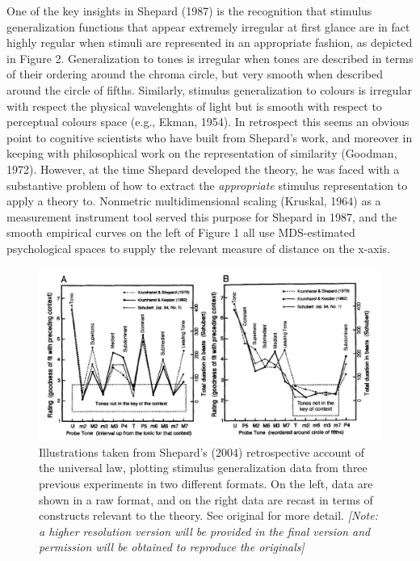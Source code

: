 \documentclass[english,doc]{apa6}
\begin{document}
One of the key insights in Shepard (1987) is the recognition that stimulus generalization functions that appear extremely irregular at first glance are in fact highly regular when stimuli are represented in an appropriate fashion, as depicted in Figure 2. Generalization to tones is irregular when tones are described in terms of their ordering around the chroma circle, but very smooth when described around the circle of fifths. Similarly, stimulus generalization to colours is irregular with respect the physical wavelenghts of light but is smooth with respect to perceptual colours space (e.g., Ekman, 1954). In retrospect this seems an obvious point to cognitive scientists who have built from Shepard's work, and moreover in keeping with philosophical work on the representation of similarity (Goodman, 1972). However, at the time Shepard developed the theory, he was faced with a substantive problem of how to extract the \emph{appropriate} stimulus representation to apply a theory to. Nonmetric multidimensional scaling (Kruskal, 1964) as a measurement instrument tool served this purpose for Shepard in 1987, and the smooth empirical curves on the left of Figure 1 all use MDS-estimated psychological spaces to supply the relevant measure of distance on the x-axis.



\begin{figure}[t]
\includegraphics[width=5.51in]{shepard2} \caption{Illustrations taken from Shepard's (2004) retrospective account of the universal law, plotting stimulus generalization data from three previous experiments in two different formats. On the left, data are shown in a raw format, and on the right data are recast in terms of constructs relevant to the theory. See original for more detail. \emph{{[}Note: a higher resolution version will be provided in the final version and permission will be obtained to reproduce the originals{]}}}\label{fig:unnamed-chunk-2}
\end{figure}
\end{document}
